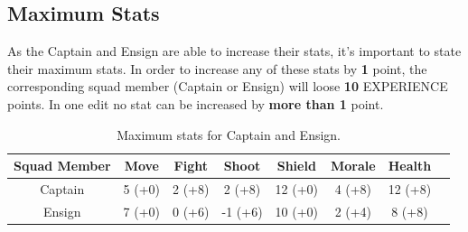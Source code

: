 \documentclass[12pt,a4paper]{article}
\begin{document}
\subsection{Maximum Stats}

As the Captain and Ensign are able to increase their stats, it's important to state their maximum stats. In order to increase any of these stats by \textbf{1} point, the corresponding squad member (Captain or Ensign) will loose \textbf{10} EXPERIENCE points. In one edit no stat can be increased by \textbf{more than 1} point.

\begin{table}[!ht]
\begin{center}
\begin{tabular}{|c|c|c|c|c|c|c|c|}
\hline
{\bf Squad Member} & {\bf Move} & {\bf Fight} & {\bf Shoot} & {\bf Shield} & {\bf Morale} & {\bf Health}\\
\hline
  Captain & 5 (+0) & 2 (+8) & 2 (+8) & 12 (+0) & 4 (+8) & 12 (+8)\\
  \hline
  Ensign & 7 (+0) & 0 (+6) & -1 (+6) & 10 (+0) & 2 (+4) & 8 (+8)\\
\hline
\end{tabular}
\end{center}
\caption{Maximum stats for Captain and Ensign.}
\label{simple_table}
\end{table}






\end{document}
